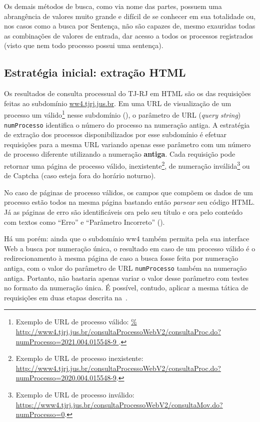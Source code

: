 Os demais métodos de busca, como via nome das partes, possuem uma abrangência
de valores muito grande e difícil de se conhecer em sua totalidade ou, nos
casos como a busca por Sentença, não são capazes de, mesmo exauridas todas as
combinações de valores de entrada, dar acesso a todos os processos registrados
(visto que nem todo processo possui uma sentença).

\subsection{Estratégia inicial: extração HTML\label{sec:extração-html}}

\newcommand{\urlProcValido}{\url{%
    http://www4.tjrj.jus.br/consultaProcessoWebV2/consultaProc.do?numProcesso=2021.004.015548-9
}}

Os resultados de consulta processual do TJ-RJ em HTML são os das requisições
feitas ao subdomínio \url{ww4.tjrj.jus.br}. Em uma URL de visualização de um
processo um válido\footnote{Exemplo de URL de processo válido: \urlProcValido.}
nesse subdomínio (), o parâmetro de URL
(\textit{query string}) \texttt{numProcesso} identifica o número do processo na
numeração antiga. A estratégia de extração dos processos disponibilizados por
esse subdomínio é efetuar requisições para a mesma URL variando apenas esse
parâmetro com um número de processo diferente utilizando a numeração
\textbf{antiga}. Cada requisição pode retornar uma página de processo válido,
inexistente\footnote{Exemplo de URL de processo inexistente:
\url{http://www4.tjrj.jus.br/consultaProcessoWebV2/consultaProc.do?numProcesso=2020.004.015548-9}.},
de numeração inválida\footnote{Exemplo de URL de processo inválido:
\url{https://www4.tjrj.jus.br/consultaProcessoWebV2/consultaMov.do?numProcesso=0}.}
ou de Captcha (caso esteja fora do horário noturno).

No caso de páginas de processo válidos, os campos que compõem os dados de um
processo estão todos na mesma página bastando então \textit{parsear} seu código
HTML. Já as páginas de erro são identificáveis ora pelo seu título e ora pelo
conteúdo com textos como ``Erro'' e ``Parâmetro Incorreto''
().

Há um porém: ainda que o subdomínio ww4 também permita pela sua interface Web a
busca por numeração única, o resultado em caso de um processo válido é o
redirecionamento à mesma página de caso a busca fosse feita por numeração
antiga, com o valor do parâmetro de URL \texttt{numProcesso} também na
numeração antiga. Portanto, não bastaria apenas variar o valor desse parâmetro
com testes no formato da numeração única. É possível, contudo, aplicar a mesma
tática de requisições em duas etapas descrita
na~.

